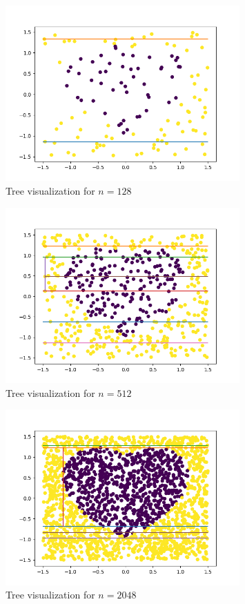 \documentclass[a4paper]{article}
\theoremstyle{definition}
\newenvironment{soln}{
    \leavevmode\color{blue}\ignorespaces
}{}
\begin{document}
\begin{soln}
    \begin{figure}[H]
      \centering
      \includegraphics[width=0.8\textwidth]{../plots/dbig_128.png}
      \caption{Tree visualization for $n = 128$}
      \label{fig:dbig_128}
    \end{figure}

    \begin{figure}[H]
      \centering
      \includegraphics[width=0.8\textwidth]{../plots/dbig_512.png}
      \caption{Tree visualization for $n = 512$}
      \label{fig:dbig_512}
    \end{figure}

    \begin{figure}[H]
      \centering
      \includegraphics[width=0.8\textwidth]{../plots/dbig_2048.png}
      \caption{Tree visualization for $n = 2048$}
      \label{fig:dbig_2048}
    \end{figure}


\end{soln}
\end{document}
